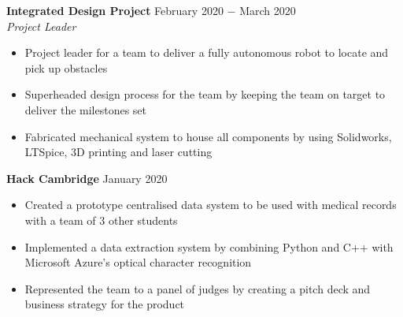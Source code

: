 \documentclass[8pt]{article}
\begin{document}

\textbf{Integrated Design Project} \hfill February 2020 $-$ March 2020\\
\textit{Project Leader}
\begin{itemize}
    \item Project leader for a team to deliver a fully autonomous robot to locate and pick up obstacles
    \item Superheaded design process for the team by keeping the team on target to deliver the milestones set
    \item Fabricated mechanical system to house all components by using Solidworks, LTSpice, 3D printing and laser cutting
\end{itemize} \medskip

\textbf{Hack Cambridge} \hfill January 2020
\begin{itemize}
    \item Created a prototype centralised data system to be used with medical records with a team of 3 other students
    \item Implemented a data extraction system by combining Python and C++ with Microsoft Azure’s optical character recognition 
    \item Represented the team to a panel of judges by creating a pitch deck and business strategy for the product
\end{itemize} \medskip

\end{document}
